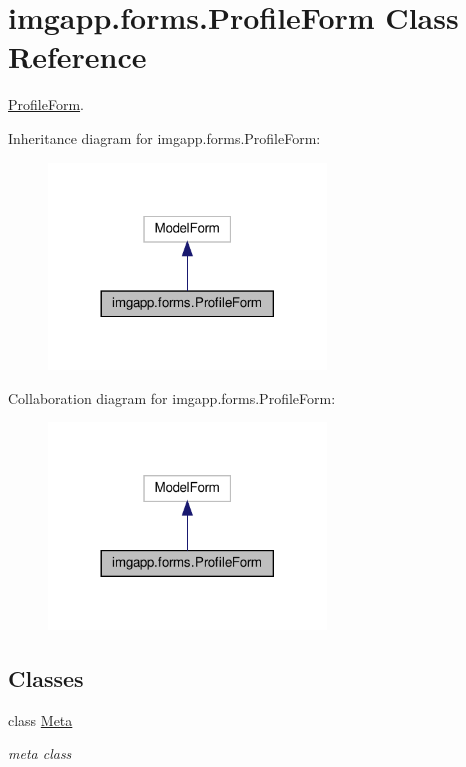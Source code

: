 \hypertarget{classimgapp_1_1forms_1_1ProfileForm}{}\section{imgapp.\+forms.\+Profile\+Form Class Reference}
\label{classimgapp_1_1forms_1_1ProfileForm}


\hyperlink{classimgapp_1_1forms_1_1ProfileForm}{Profile\+Form}.  




Inheritance diagram for imgapp.\+forms.\+Profile\+Form\+:
\nopagebreak
\begin{figure}[H]
\begin{center}
\leavevmode
\includegraphics[width=209pt]{classimgapp_1_1forms_1_1ProfileForm__inherit__graph}
\end{center}
\end{figure}


Collaboration diagram for imgapp.\+forms.\+Profile\+Form\+:
\nopagebreak
\begin{figure}[H]
\begin{center}
\leavevmode
\includegraphics[width=209pt]{classimgapp_1_1forms_1_1ProfileForm__coll__graph}
\end{center}
\end{figure}
\subsection*{Classes}
\begin{DoxyCompactItemize}
\item 
class \hyperlink{classimgapp_1_1forms_1_1ProfileForm_1_1Meta}{Meta}
\begin{DoxyCompactList}\small\item\em meta class \end{DoxyCompactList}\end{DoxyCompactItemize}


